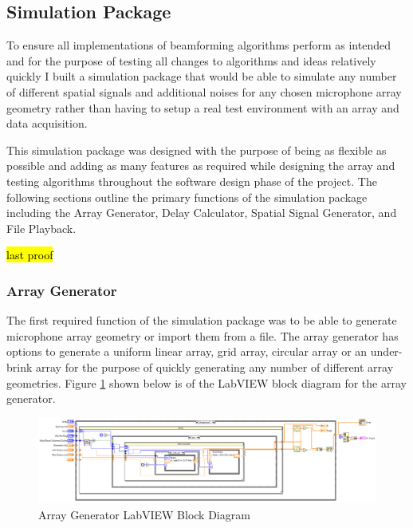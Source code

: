 \documentclass{UoNMCHA}
\numberwithin{equation}{section}
\begin{document}
\subsection{Simulation Package} \label{sec:Software Sim}
    
    To ensure all implementations of beamforming algorithms perform as intended and for the purpose of testing all changes to algorithms and ideas relatively quickly I built a simulation package that would be able to simulate any number of different spatial signals and additional noises for any chosen microphone array geometry rather than having to setup a real test environment with an array and data acquisition.
    
    This simulation package was designed with the purpose of being as flexible as possible and adding as many features as required while designing the array and testing algorithms throughout the software design phase of the project. The following sections outline the primary functions of the simulation package including the Array Generator, Delay Calculator, Spatial Signal Generator, and File Playback.
    
    \hl{last proof}
    
\subsubsection{Array Generator} \label{sec:Array Generator}
    The first required function of the simulation package was to be able to generate microphone array geometry or import them from a file. The array generator has options to generate a uniform linear array, grid array, circular array or an under-brink array for the purpose of quickly generating any number of different array geometries. Figure \ref{fig:ArrayGenBlock} shown below is of the LabVIEW block diagram for the array generator.
    
    \begin{figure}[H]
        \centering
        \includegraphics[keepaspectratio, width = \textwidth]{Figures/ArrayGenBlock.png}
        \caption{Array Generator LabVIEW Block Diagram}
        \label{fig:ArrayGenBlock}
    \end{figure}
    
\end{document}
